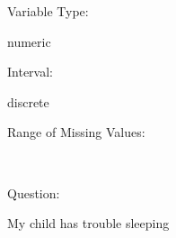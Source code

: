 \documentclass[
]{article}
\begin{document}
\begin{minipage}[t]{0.3\linewidth}

Variable Type:

\end{minipage}%
\begin{minipage}[t]{0.7\linewidth}

numeric

\end{minipage}

\begin{minipage}[t]{0.3\linewidth}

Interval:

\end{minipage}%
\begin{minipage}[t]{0.7\linewidth}

discrete

\end{minipage}

\begin{minipage}[t]{0.3\linewidth}

Range of Missing Values:

\end{minipage}%
\begin{minipage}[t]{0.7\linewidth}

~

\end{minipage}

\begin{minipage}[t]{0.3\linewidth}

Question:

\end{minipage}%
\begin{minipage}[t]{0.7\linewidth}

My child has trouble sleeping

\end{minipage}
\end{document}
